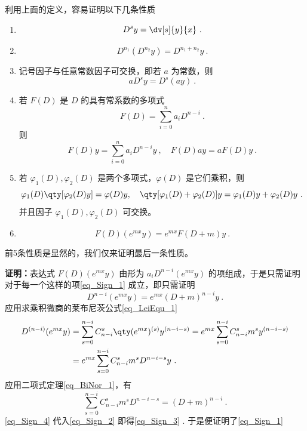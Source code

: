 利用上面的定义，容易证明以下几条性质
\begin{enumerate}
\item 
\begin{equation}
D^sy=\dv[s]{y}{x}~.
\end{equation}
\item 
\begin{equation}
D^{n_1}(D^{n_2}y)=D^{n_1+n_2}y~.
\end{equation}
\item 记号因子与任意常数因子可交换，即若 $a$ 为常数，则
\begin{equation}
aD^sy=D^s(ay)~.
\end{equation}
\item 若 $F(D)$ 是 $D$ 的具有常系数的多项式
\begin{equation}
F(D)=\sum_{i=0}^{n}a_iD^{n-i}~.
\end{equation}
则
\begin{equation}
F(D)y=\sum_{i=0}^{n}a_iD^{n-i}y~,\quad F(D)ay=aF(D)y~.
\end{equation}
\item 若 $\varphi_1(D),\varphi_2(D)$ 是两个多项式，$\varphi(D)$ 是它们乘积，则
\begin{equation}\label{eq_Sign_11}
\varphi_1(D)\qty[\varphi_2(D)y]=\varphi(D)y,\quad \qty[\varphi_1(D)+\varphi_2(D)]y=\varphi_1(D)y+\varphi_2(D)y~.
\end{equation}
并且因子 $\varphi_1(D),\varphi_2(D)$ 可交换。
\item \begin{equation}\label{eq_Sign_1}
F(D)(e^{mx}y)=e^{mx}F(D+m)y~.
\end{equation}
\end{enumerate}

前5条性质是显然的，我们仅来证明最后一条性质。

\textbf{证明：}表达式 $F(D)(e^{mx}y)$ 由形为 $a_{i}D^{n-i}(e^{mx}y)$ 的项组成，于是只需证明对于每一个这样的项\autoref{eq_Sign_1} 成立，即只需证明
\begin{equation}\label{eq_Sign_3}
D^{n-i}(e^{mx}y)=e^{mx}(D+m)^{n-i}y~.
\end{equation}
应用求乘积微商的莱布尼茨公式\autoref{eq_LeiEqu_1} 
\begin{equation}\label{eq_Sign_2}
\begin{aligned}
D^{(n-i)}(e^{mx}y)&=\sum_{s=0}^{n-i}C_{n-i}^s\qty(e^{mx})^{(s)}y^{(n-i-s)}=e^{mx}\sum_{s=0}^{n-i}C_{n-i}^sm^sy^{(n-i-s)}\\
&=e^{mx}\sum_{s=0}^{n-i}C_{n-i}^sm^sD^{n-i-s}y~.
\end{aligned}
\end{equation}
应用二项式定理\autoref{eq_BiNor_1}，有
\begin{equation}\label{eq_Sign_4}
\sum_{s=0}^{n-i}C_{n-i}^sm^sD^{n-i-s}=(D+m)^{n-i}~.
\end{equation}
\autoref{eq_Sign_4}  代入\autoref{eq_Sign_2} 即得\autoref{eq_Sign_3} . 于是便证明了\autoref{eq_Sign_1} 

